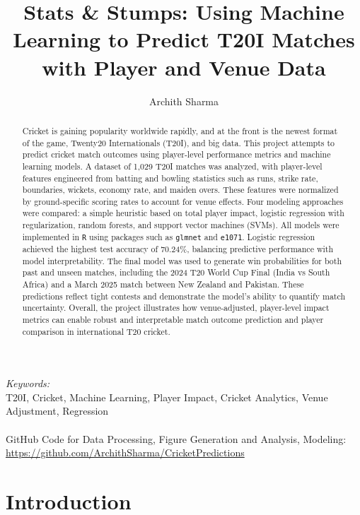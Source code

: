 \documentclass{article}[12pt]
\title{Stats \& Stumps: Using Machine Learning to Predict T20I Matches with Player and Venue Data}
\author[1]{Archith Sharma}
\date{}
\affil[1]{Texas Academy of Mathematics and Science}
\begin{document}
\maketitle
\begin{abstract}
Cricket is gaining popularity worldwide rapidly, and at the front is the newest format of the game, Twenty20 Internationals (T20I), and big data. This project attempts to predict cricket match outcomes using player-level performance metrics and machine learning models. A dataset of 1,029 T20I matches was analyzed, with player-level features engineered from batting and bowling statistics such as runs, strike rate, boundaries, wickets, economy rate, and maiden overs. These features were normalized by ground-specific scoring rates to account for venue effects. Four modeling approaches were compared: a simple heuristic based on total player impact, logistic regression with regularization, random forests, and support vector machines (SVMs). All models were implemented in \texttt{R} using packages such as \texttt{glmnet} and \texttt{e1071}. Logistic regression achieved the highest test accuracy of 70.24\%, balancing predictive performance with model interpretability. The final model was used to generate win probabilities for both past and unseen matches, including the 2024 T20 World Cup Final (India vs South Africa) and a March 2025 match between New Zealand and Pakistan. These predictions reflect tight contests and demonstrate the model's ability to quantify match uncertainty. Overall, the project illustrates how venue-adjusted, player-level impact metrics can enable robust and interpretable match outcome prediction and player comparison in international T20 cricket.
\end{abstract}
\textit{Keywords:} \\
T20I, Cricket, Machine Learning, Player Impact, Cricket Analytics, Venue Adjustment, Regression
\\
\\
GitHub Code for Data Processing, Figure Generation and Analysis, Modeling: \\ \href{https://github.com/ArchithSharma/CricketPredictions}{https://github.com/ArchithSharma/CricketPredictions}

\pagebreak
\begin{onehalfspacing}
\tableofcontents
\end{onehalfspacing}
\pagebreak
\section{Introduction}
\end{document}
